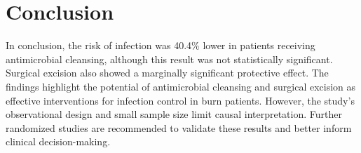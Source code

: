 \documentclass[12pt]{article}
\begin{document}
\section*{Conclusion}

In conclusion, the risk of infection was 40.4\% lower in patients receiving antimicrobial cleansing, although this result was not statistically significant. Surgical excision also showed a marginally significant protective effect. The findings highlight the potential of antimicrobial cleansing and surgical excision as effective interventions for infection control in burn patients. However, the study's observational design and small sample size limit causal interpretation. Further randomized studies are recommended to validate these results and better inform clinical decision-making.




\end{document}
